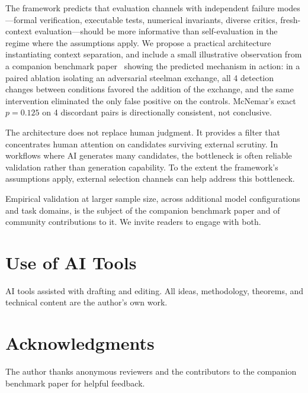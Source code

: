 \documentclass[11pt]{article}
\begin{document}
The framework predicts that evaluation channels with independent failure modes---formal verification, executable tests, numerical invariants, diverse critics, fresh-context evaluation---should be more informative than self-evaluation in the regime where the assumptions apply. We propose a practical architecture instantiating context separation, and include a small illustrative observation from a companion benchmark paper~\citep{brilliant2026benchmark} showing the predicted mechanism in action: in a paired ablation isolating an adversarial steelman exchange, all 4 detection changes between conditions favored the addition of the exchange, and the same intervention eliminated the only false positive on the controls. McNemar's exact $p = 0.125$ on 4 discordant pairs is directionally consistent, not conclusive.

The architecture does not replace human judgment. It provides a filter that concentrates human attention on candidates surviving external scrutiny. In workflows where AI generates many candidates, the bottleneck is often reliable validation rather than generation capability. To the extent the framework's assumptions apply, external selection channels can help address this bottleneck.

Empirical validation at larger sample size, across additional model configurations and task domains, is the subject of the companion benchmark paper and of community contributions to it. We invite readers to engage with both.

\section*{Use of AI Tools}

AI tools assisted with drafting and editing. All ideas, methodology, theorems, and technical content are the author's own work.

\section*{Acknowledgments}

The author thanks anonymous reviewers and the contributors to the companion benchmark paper for helpful feedback.
\end{document}

